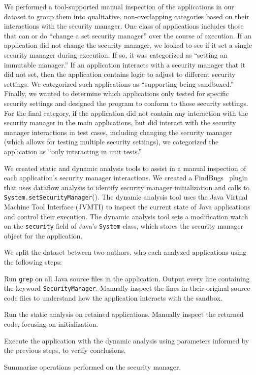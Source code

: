 \documentclass{sig-alternate}
\begin{document}
We performed a tool-supported manual inspection of the applications in our
dataset to group them
into qualitative, non-overlapping categories based on their interactions with the security 
manager. One class of applications includes those that 
can or do ``change a set security manager'' over the course of execution.
If an application did not change the security manager, 
we looked to see if it set a single security manager 
during execution.  If so, it
was categorized as ``setting an immutable manager.''  If an
application interacts with a security manager that it did not set, 
then the application contains logic to adjust to different security settings.
We categorized such applications
as ``supporting being sandboxed.''  Finally, we wanted to determine
which applications only tested for specific security settings and designed
the program to conform to those security settings. 
For the final category, if the
application did not contain any interaction with the security manager in 
the main applications, but did interact with the security manager 
interactions in test cases, including changing the security manager (which 
allows for testing multiple security settings), we categorized the
application as ``only interacting in unit tests.''

We created static and dynamic analysis tools
to assist in a manual inspection of each application's security manager
interactions. We created a 
FindBugs~\cite{hovemeyer_finding_2004} plugin that
uses dataflow analysis to identify security manager initialization and calls to \texttt{System.setSecurityManager}().
The dynamic analysis tool uses the Java Virtual Machine
Tool Interface (JVMTI) \cite{_jvmti}
to inspect the current state of Java applications and control
their execution. The dynamic analysis tool sets a modification watch
on the \texttt{security} field of Java's \texttt{System} class, which
stores the security manager object for the application.

We split the dataset between two authors, who each analyzed
applications using the following steps:

\begin{flushenum}\setlength{\parskip}{0pt}
  \setlength{\parsep}{0pt}
  \setlength{\itemsep}{0pt}
\item Run \texttt{grep} on all Java source files in the application.
Output every line containing the keyword \texttt{SecurityManager}.
Manually inspect the lines in their original source code files to understand
how the application interacts with the sandbox.
\item Run the static analysis on retained applications. Manually inspect the
  returned code, focusing on initialization. 
\item Execute the application with the dynamic analysis using parameters
  informed by the previous steps, 
to verify conclusions.
\item Summarize operations performed
on the security manager.
\end{flushenum}
\end{document}
